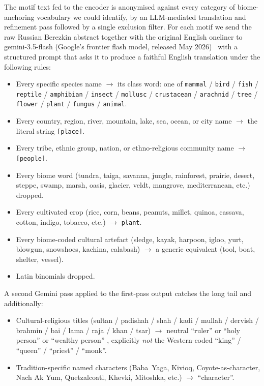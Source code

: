 \documentclass[11pt,a4paper]{article}
\begin{document}
The motif text fed to the encoder is anonymised against every
category of biome-anchoring vocabulary we could identify, by an
LLM-mediated translation and refinement pass followed by a single
exclusion filter. For each motif we send the raw Russian Berezkin
abstract together with the original English oneliner to
gemini-3.5-flash (Google's frontier flash model, released May
2026)~\citep{googlegemini2026} with a structured prompt that asks
it to produce a faithful English translation under the following
rules:

\begin{itemize}\itemsep1pt
\item Every specific species name $\to$ its class word: one of
  \texttt{mammal} / \texttt{bird} / \texttt{fish} / \texttt{reptile}
  / \texttt{amphibian} / \texttt{insect} / \texttt{mollusc} /
  \texttt{crustacean} / \texttt{arachnid} / \texttt{tree} /
  \texttt{flower} / \texttt{plant} / \texttt{fungus} /
  \texttt{animal}.
\item Every country, region, river, mountain, lake, sea, ocean, or
  city name $\to$ the literal string \texttt{[place]}.
\item Every tribe, ethnic group, nation, or ethno-religious
  community name $\to$ \texttt{[people]}.
\item Every biome word (tundra, taiga, savanna, jungle, rainforest,
  prairie, desert, steppe, swamp, marsh, oasis, glacier, veldt,
  mangrove, mediterranean, etc.) dropped.
\item Every cultivated crop (rice, corn, beans, peanuts, millet,
  quinoa, cassava, cotton, indigo, tobacco, etc.) $\to$
  \texttt{plant}.
\item Every biome-coded cultural artefact (sledge, kayak, harpoon,
  igloo, yurt, blowgun, snowshoes, kachina, calabash) $\to$ a
  generic equivalent (tool, boat, shelter, vessel).
\item Latin binomials dropped.
\end{itemize}

A second Gemini pass applied to the first-pass output catches the
long tail and additionally:

\begin{itemize}\itemsep1pt
\item Cultural-religious titles (sultan / padishah / shah / kadi /
  mullah / dervish / brahmin / bai / lama / raja / khan / tsar)
  $\to$ neutral ``ruler'' or ``holy person'' or ``wealthy person''
 , explicitly \emph{not} the Western-coded ``king'' / ``queen''
  / ``priest'' / ``monk''.
\item Tradition-specific named characters (Baba~Yaga, Kivioq,
  Coyote-as-character, Nach Ak Yum, Quetzalcoatl, Khevki,
  Mitoshka, etc.) $\to$ ``character''.
\end{itemize}
\end{document}
